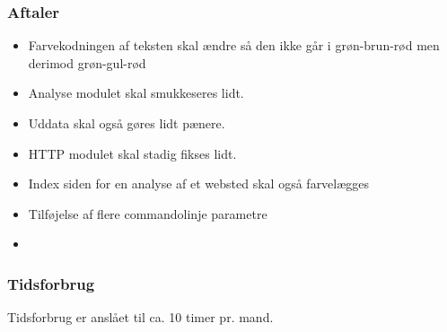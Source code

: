 \subsubsection{Aftaler}
\begin{itemize}
 \item Farvekodningen af teksten skal ændre så den ikke går i grøn-brun-rød men derimod grøn-gul-rød
\item Analyse modulet skal smukkeseres lidt.
\item Uddata skal også gøres lidt pænere.
\item HTTP modulet skal stadig fikses lidt.
\item Index siden for en analyse af et websted skal også farvelægges
\item Tilføjelse af flere commandolinje parametre
\item 
\end{itemize}

\subsubsection{Tidsforbrug}
Tidsforbrug er anslået til ca. 10 timer pr. mand.
